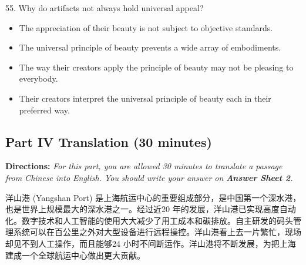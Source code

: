 \documentclass[UTF8,11pt]{ctexart}
\begin{document}
55. Why do artifacts not always hold universal appeal?


\begin{itemize}[leftmargin=2em,itemsep=.2em,topsep=.4em]\item[A.] The appreciation of their beauty is not subject to objective standards.
\item[B.] The universal principle of beauty prevents a wide array of embodiments.
\item[C.] The way their creators apply the principle of beauty may not be pleasing to everybody.
\item[D.] Their creators interpret the universal principle of beauty each in their preferred way.
\end{itemize}

\subsection*{\textbf{Part IV Translation} \textbf{(30 minutes)}}


\textbf{Directions: }\textit{For this part, you are allowed 30 minutes to translate a passage from Chinese into English. You} \textit{should write your answer on }\textbf{\textit{Answer Sheet 2}}\textit{.}


洋山港 (Yangshan Port) 是上海航运中心的重要组成部分，是中国第一个深水港，也是世界上规模最大的深水港之一。经过近20 年的发展，洋山港已实现高度自动化。数字技术和人工智能的使用大大减少了用工成本和碳排放。自主研发的码头管理系统可以在百公里之外对大型设备进行远程操控。洋山港看上去一片繁忙，现场却见不到人工操作，而且能够24 小时不间断运作。洋山港将不断发展，为把上海建成一个全球航运中心做出更大贡献。
\end{document}
